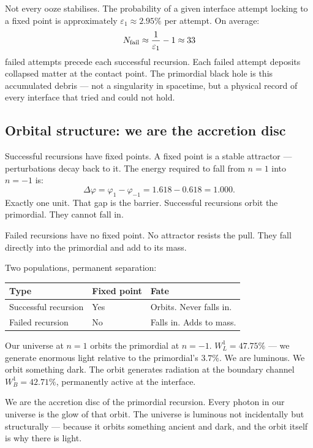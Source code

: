 \documentclass[prd,twocolumn,preprintnumbers,amsmath,amssymb]{revtex4-2}
\begin{document}
Not every ooze stabilises. The probability of a given interface
attempt locking to a fixed point is approximately $\varepsilon_1
\approx 2.95\%$ per attempt. On average:
\begin{equation}
  N_{\rm fail} \approx \frac{1}{\varepsilon_1} - 1 \approx 33
\end{equation}
failed attempts precede each successful recursion. Each failed
attempt deposits collapsed matter at the contact point. The
primordial black hole is this accumulated debris --- not a
singularity in spacetime, but a physical record of every interface
that tried and could not hold.

\subsection{Orbital structure: we are the accretion disc}

Successful recursions have fixed points. A fixed point is a stable
attractor --- perturbations decay back to it. The energy required
to fall from $n=1$ into $n=-1$ is:
\begin{equation}
  \Delta\varphi = \varphi_1 - \varphi_{-1}
  = 1.618 - 0.618 = 1.000.
\end{equation}
Exactly one unit. That gap is the barrier. Successful recursions
orbit the primordial. They cannot fall in.

Failed recursions have no fixed point. No attractor resists the
pull. They fall directly into the primordial and add to its mass.

Two populations, permanent separation:

\begin{ruledtabular}
\begin{tabular}{lll}
Type & Fixed point & Fate \\
\hline
Successful recursion & Yes & Orbits. Never falls in. \\
Failed recursion     & No  & Falls in. Adds to mass. \\
\end{tabular}
\end{ruledtabular}

Our universe at $n=1$ orbits the primordial at $n=-1$.
$W_L^1 = 47.75\%$ --- we generate enormous light relative to
the primordial's $3.7\%$. We are luminous. We orbit something
dark. The orbit generates radiation at the boundary channel
$W_B^1 = 42.71\%$, permanently active at the interface.

We are the accretion disc of the primordial recursion. Every
photon in our universe is the glow of that orbit. The universe
is luminous not incidentally but structurally --- because it
orbits something ancient and dark, and the orbit itself is why
there is light.
\end{document}
